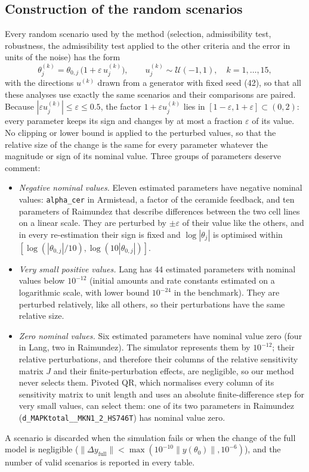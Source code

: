 \subsection*{Construction of the random scenarios}
Every random scenario used by the method (selection, admissibility test, robustness, the admissibility test applied to the other criteria and the error in units of the noise) has the form
\[ \theta^{(k)}_j=\theta_{0,j}\,\bigl(1+\varepsilon\,u^{(k)}_j\bigr),\qquad u^{(k)}_j\sim\mathcal U(-1,1),\quad k=1,\dots,15, \]
with the directions $u^{(k)}$ drawn from a generator with fixed seed (42), so that all these analyses use exactly the same scenarios and their comparisons are paired. Because $|\varepsilon u^{(k)}_j|\le\varepsilon\le0.5$, the factor $1+\varepsilon u^{(k)}_j$ lies in $[1-\varepsilon,1+\varepsilon]\subset(0,2)$: every parameter keeps its sign and changes by at most a fraction $\varepsilon$ of its value. No clipping or lower bound is applied to the perturbed values, so that the relative size of the change is the same for every parameter whatever the magnitude or sign of its nominal value. Three groups of parameters deserve comment:
\begin{itemize}\itemsep0pt
\item \emph{Negative nominal values.} Eleven estimated parameters have negative nominal values: \texttt{alpha\_cer} in Armistead, a factor of the ceramide feedback, and ten parameters of Raimundez that describe differences between the two cell lines on a linear scale. They are perturbed by $\pm\varepsilon$ of their value like the others, and in every re-estimation their sign is fixed and $\log|\theta_j|$ is optimised within $[\log(|\theta_{0,j}|/10),\log(10|\theta_{0,j}|)]$.
\item \emph{Very small positive values.} Lang has 44 estimated parameters with nominal values below $10^{-12}$ (initial amounts and rate constants estimated on a logarithmic scale, with lower bound $10^{-24}$ in the benchmark). They are perturbed relatively, like all others, so their perturbations have the same relative size.
\item \emph{Zero nominal values.} Six estimated parameters have nominal value zero (four in Lang, two in Raimundez). The simulator represents them by $10^{-12}$; their relative perturbations, and therefore their columns of the relative sensitivity matrix $J$ and their finite-perturbation effects, are negligible, so our method never selects them. Pivoted QR, which normalises every column of its sensitivity matrix to unit length and uses an absolute finite-difference step for very small values, can select them: one of its two parameters in Raimundez (\texttt{d\_MAPKtotal\_\_MKN1\_2\_HS746T}) has nominal value zero.
\end{itemize}
A scenario is discarded when the simulation fails or when the change of the full model is negligible ($\|\Delta y_{\mathrm{full}}\|<\max(10^{-10}\|y(\theta_0)\|,10^{-6})$), and the number of valid scenarios is reported in every table.

